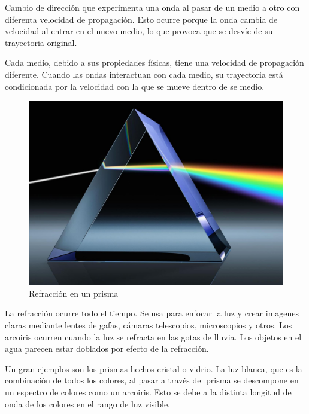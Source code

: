 Cambio de dirección que experimenta una onda al pasar de un medio a otro con diferenta velocidad de propagación. Esto ocurre porque la onda cambia de velocidad al entrar en el nuevo medio, lo que provoca que se desvíe de su trayectoria original.

Cada medio, debido a sus propiedades físicas, tiene una velocidad de propagación diferente. Cuando las ondas interactuan con cada medio, su trayectoria está condicionada por la velocidad con la que se mueve dentro de se medio.

\begin{figure}
  \centering
  \includegraphics[scale=0.5]{imagenes/prisma.png}
  \caption{Refracción en un prisma\cite{cstmglassprism}}
\end{figure}

La refracción ocurre todo el tiempo. Se usa para enfocar la luz y crear imagenes claras mediante lentes de gafas, cámaras telescopios, microscopios y otros. Los arcoiris ocurren cuando la luz se refracta en las gotas de lluvia. Los objetos en el agua parecen estar doblados por efecto de la refracción.

Un gran ejemplos son los prismas hechos cristal o vidrio. La luz blanca, que es la combinación de todos los colores, al pasar a través del prisma se descompone en un espectro de colores como un arcoiris. Esto se debe a la distinta longitud de onda de los colores en el rango de luz visible.
